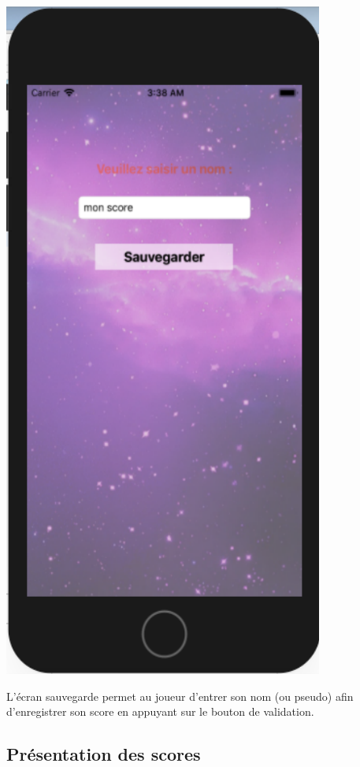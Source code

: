 \documentclass{article}
\begin{document}
   \begin{minipage}[c]{.46\linewidth}
    \begin{center}
            \includegraphics[scale=0.38]{SaveScoreIOS.png}
        \end{center}
 \end{minipage}

L'écran sauvegarde permet au joueur d'entrer son nom (ou pseudo) afin d'enregistrer son score en appuyant sur le bouton de validation.

\subsection{Présentation des scores}
\end{document}
